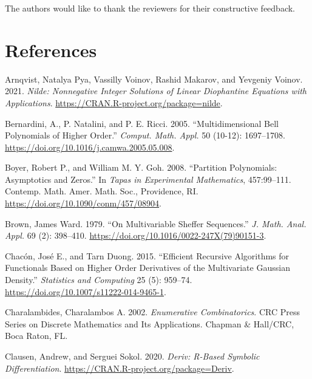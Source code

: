 The authors would like to thank the reviewers for their constructive feedback.

\hypertarget{references}{%
\section*{References}\label{references}}

\hypertarget{refs}{}
\begin{CSLReferences}{1}{0}
\leavevmode{}%
Arnqvist, Natalya Pya, Vassilly Voinov, Rashid Makarov, and Yevgeniy Voinov. 2021. \emph{Nilde: Nonnegative Integer Solutions of Linear Diophantine Equations with Applications}. \url{https://CRAN.R-project.org/package=nilde}.

\leavevmode{}%
Bernardini, A., P. Natalini, and P. E. Ricci. 2005. {``Multidimensional {B}ell Polynomials of Higher Order.''} \emph{Comput. Math. Appl.} 50 (10-12): 1697--1708. \url{https://doi.org/10.1016/j.camwa.2005.05.008}.

\leavevmode{}%
Boyer, Robert P., and William M. Y. Goh. 2008. {``Partition Polynomials: Asymptotics and Zeros.''} In \emph{Tapas in Experimental Mathematics}, 457:99--111. Contemp. Math. Amer. Math. Soc., Providence, RI. \url{https://doi.org/10.1090/conm/457/08904}.

\leavevmode{}%
Brown, James Ward. 1979. {``On Multivariable {S}heffer Sequences.''} \emph{J. Math. Anal. Appl.} 69 (2): 398--410. \url{https://doi.org/10.1016/0022-247X(79)90151-3}.

\leavevmode{}%
Chacón, José E., and Tarn Duong. 2015. {``Efficient Recursive Algorithms for Functionals Based on Higher Order Derivatives of the Multivariate {G}aussian Density.''} \emph{Statistics and Computing} 25 (5): 959--74. \url{https://doi.org/10.1007/s11222-014-9465-1}.

\leavevmode{}%
Charalambides, Charalambos A. 2002. \emph{Enumerative Combinatorics}. CRC Press Series on Discrete Mathematics and Its Applications. Chapman \& Hall/CRC, Boca Raton, FL.

\leavevmode{}%
Clausen, Andrew, and Serguei Sokol. 2020. \emph{{Deriv}: R-Based Symbolic Differentiation}. \url{https://CRAN.R-project.org/package=Deriv}.


\end{CSLReferences}
